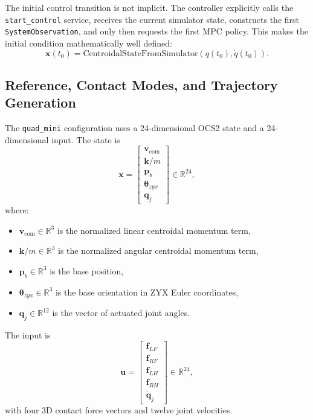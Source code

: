 \documentclass[11pt,a4paper]{article}
\newcommand{\R}{\mathbb{R}}
\newcommand{\vect}[1]{\boldsymbol{#1}}
\newcommand{\code}[1]{\texttt{#1}}
\begin{document}
The initial control transition is not implicit. The controller explicitly calls the \code{start\_control} service, receives the current
simulator state, constructs the first \code{SystemObservation}, and only then requests the first MPC policy. This makes the initial
condition mathematically well defined:
\begin{equation}
\vect{x}(t_0) = \mathrm{CentroidalStateFromSimulator}(q(t_0),\dot{q}(t_0)).
\end{equation}

\subsection{Reference, Contact Modes, and Trajectory Generation}

The \code{quad\_mini} configuration uses a 24-dimensional OCS2 state and a 24-dimensional input. The state is
\begin{equation}
\vect{x} =
\begin{bmatrix}
\vect{v}_{\mathrm{com}} \\
\vect{k}/m \\
\vect{p}_b \\
\vect{\theta}_{zyx} \\
\vect{q}_j
\end{bmatrix}
\in \R^{24},
\end{equation}
where:
\begin{itemize}[leftmargin=*]
  \item $\vect{v}_{\mathrm{com}} \in \R^3$ is the normalized linear centroidal momentum term,
  \item $\vect{k}/m \in \R^3$ is the normalized angular centroidal momentum term,
  \item $\vect{p}_b \in \R^3$ is the base position,
  \item $\vect{\theta}_{zyx} \in \R^3$ is the base orientation in ZYX Euler coordinates,
  \item $\vect{q}_j \in \R^{12}$ is the vector of actuated joint angles.
\end{itemize}

The input is
\begin{equation}
\vect{u} =
\begin{bmatrix}
\vect{f}_{LF} \\
\vect{f}_{RF} \\
\vect{f}_{LH} \\
\vect{f}_{RH} \\
\dot{\vect{q}}_j
\end{bmatrix}
\in \R^{24},
\end{equation}
with four 3D contact force vectors and twelve joint velocities.
\end{document}
